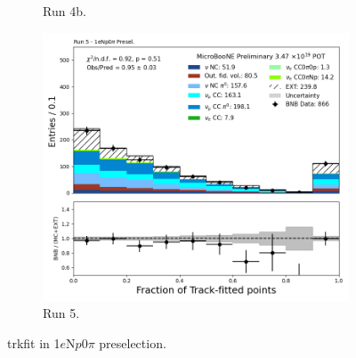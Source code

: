 \begin{figure}[H]
\begin{subfigure}[t]{0.32\linewidth}
        \caption{Run 4b.}
    \end{subfigure}%
    \hspace{0.2cm}%
    \begin{subfigure}[t]{0.32\linewidth}
        \includegraphics[width=\linewidth]{technote/Appendix_Preselection/Figures/1eNp0pi/Run5/trkfit_Run5_1eNp0pi_Presel.png}
        \caption{Run 5.}
    \end{subfigure}
    \caption{trkfit in 1$e$N$p$0$\pi$ preselection.}
\end{figure}

